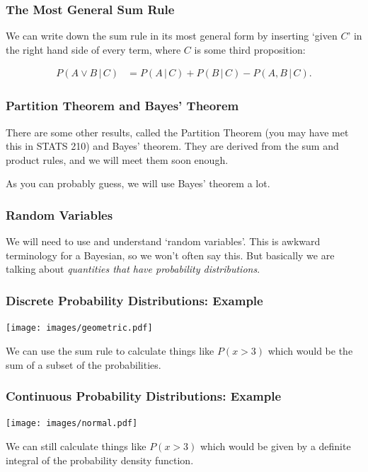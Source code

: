 \documentclass{beamer}
\newcommand{\given}{\,|\,}
\begin{document}
\begin{frame}
\frametitle{The Most General Sum Rule}
We can write down the sum rule in its most general form by inserting
`given $C$' in the right hand side of every term, where $C$ is some third
proposition:

\begin{align}
P(A \vee B \given C) &= P(A \given C) + P(B \given C) - P(A, B \given C).
\end{align}

\end{frame}

\begin{frame}
\frametitle{Partition Theorem and Bayes' Theorem}
There are some other results, called the Partition Theorem
(you may have met this
in STATS 210) and Bayes' theorem. They are derived from the sum and product
rules, and we will meet them soon enough.\\[0.5em]\pause

As you can probably guess, we will use Bayes' theorem a lot.

\end{frame}



\begin{frame}
\frametitle{Random Variables}
We will need to use and understand `random variables'. This is awkward
terminology for a Bayesian, so we won't often say this. But basically
we are talking about {\em quantities that have probability distributions}.

\end{frame}


\begin{frame}
\frametitle{Discrete Probability Distributions: Example}

\begin{center}
\texttt{[image: images/geometric.pdf]}
\end{center}

We can use the sum rule to calculate things like $P(x > 3)$ which would be
the sum of a subset of the probabilities.

\end{frame}


\begin{frame}
\frametitle{Continuous Probability Distributions: Example}

\begin{center}
\texttt{[image: images/normal.pdf]}
\end{center}

We can still calculate things like $P(x > 3)$ which would be
given by a definite integral of the probability density function.

\end{frame}
\end{document}
